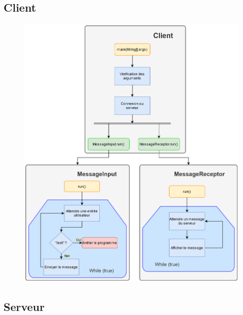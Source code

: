 \documentclass[10pt,a4paper]{article}
\begin{document}
	\subsection{Client}
	
	\begin{figure}[H]
		\includegraphics[width=\linewidth]{ressources/client_package.png}
	\end{figure}
	
	\subsection{Serveur}
	
\end{document}

